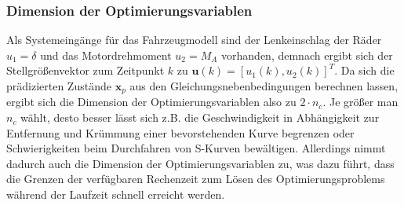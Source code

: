 \subsubsection{Dimension der Optimierungsvariablen}
Als Systemeingänge für das Fahrzeugmodell sind der Lenkeinschlag der Räder $u_1=\delta$ und das Motordrehmoment $u_2=M_A$ vorhanden, demnach ergibt sich der Stellgrößenvektor zum Zeitpunkt $k$ zu $\boldsymbol{u}(k)=[u_1(k), u_2(k)]^T$. Da sich die prädizierten Zustände $\boldsymbol{x}_p$ aus den Gleichungsnebenbedingungen berechnen lassen, ergibt sich die Dimension der Optimierungsvariablen also zu $2\cdot n_c$.
Je größer man $n_c$ wählt, desto besser lässt sich z.B. die Geschwindigkeit in Abhängigkeit zur Entfernung und Krümmung einer bevorstehenden Kurve begrenzen oder Schwierigkeiten beim Durchfahren von S-Kurven bewältigen. Allerdings nimmt dadurch auch die Dimension der Optimierungsvariablen zu, was dazu führt, dass die Grenzen der verfügbaren Rechenzeit zum Lösen des Optimierungsproblems während der Laufzeit schnell erreicht werden.
